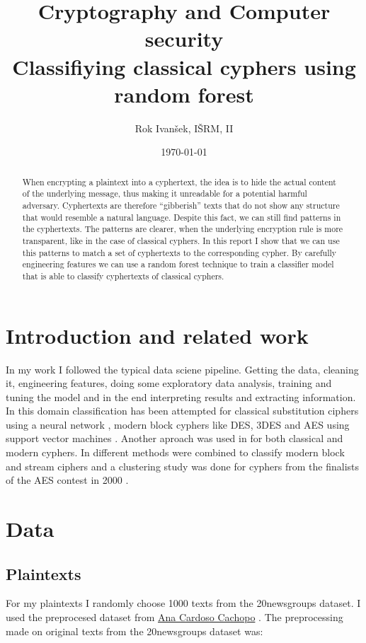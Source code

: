 \documentclass[a4paper]{article}
\title{Cryptography and Computer security\\
Classifiying classical cyphers using random forest}
\author{Rok Ivanšek, IŠRM, II}
\date{\today}
\begin{document}
\maketitle


\begin{abstract}
When encrypting a plaintext into a cyphertext, the idea is to hide the actual content of the underlying message, thus making it unreadable for a potential harmful adversary. Cyphertexts are therefore ``gibberish'' texts that do not show any structure that would resemble a natural language. Despite this fact, we can still find patterns in the cyphertexts. The patterns are clearer, when the underlying encryption rule is more transparent, like in the case of classical cyphers. In this report I show that we can use this patterns to match a set of cyphertexts to the corresponding cypher. By carefully engineering features we can use a random forest technique to train a classifier model that is able to classify cyphertexts of classical cyphers.
\end{abstract}

\section*{Introduction and related work}
In my work I followed the typical data sciene pipeline. Getting the data, cleaning it, engineering features, doing some exploratory data analysis, training and tuning the model and in the end interpreting results and extracting information. In this domain classification has been attempted for classical substitution ciphers using a neural network \cite{sivagurunathan2010classification}, modern block cyphers like DES, 3DES and AES using support vector machines \cite{dileep2006identification}. Another aproach was used in \cite{maheshwari2001classification} for both classical and modern cyphers. In \cite{mishra2013pattern} different methods were combined to classify modern block and stream ciphers and a clustering study was done for cyphers from the finalists of the AES contest in 2000 \cite{decipher}.

\section*{Data}

\subsection*{Plaintexts}
For my plaintexts I randomly choose 1000 texts from the 20newsgroups dataset. I used the preprocesed dataset from \href{http://ana.cachopo.org/datasets-for-single-label-text-categorization}{Ana Cardoso Cachopo} \cite{2007:phd-Ana-Cardoso-Cachopo}. The preprocessing made on original texts from the 20newsgroups dataset was:
\end{document}
